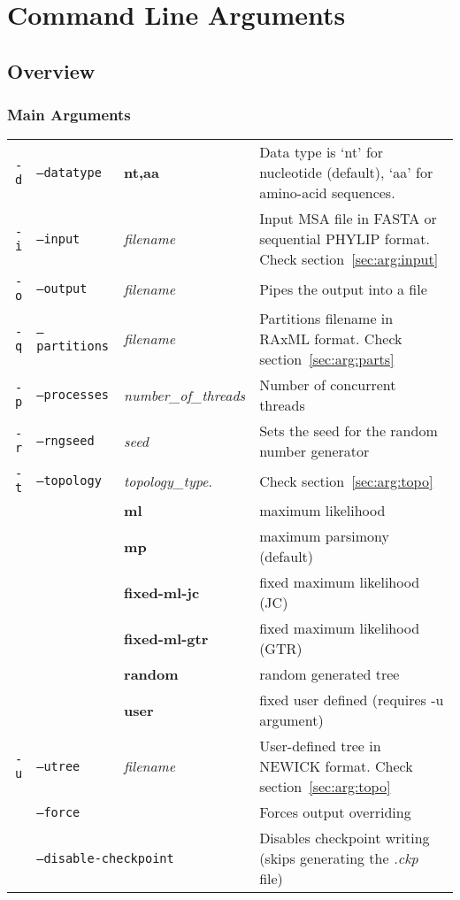\section{Command Line Arguments}
\label{sec:arguments}

\subsection{Overview}

\subsubsection{Main Arguments}

\begin{tabular}{rllp{}}
  \hline
  \texttt{-d} & \texttt{--datatype}   & \bf{nt},\bf{aa} & Data type is `nt' for nucleotide (default), `aa' for amino-acid sequences. \\
  \texttt{-i} & \texttt{--input}      & {\em filename} & Input MSA file in FASTA or sequential PHYLIP format. Check section~\ref{sec:arg:input} \\
  \texttt{-o} & \texttt{--output}     & {\em filename} & Pipes the output into a file \\
  \texttt{-q} & \texttt{--partitions} & {\em filename} & Partitions filename in RAxML format. Check section~\ref{sec:arg:parts} \\
  \texttt{-p} & \texttt{--processes}  & {\em number\_of\_threads} & Number of concurrent threads \\
  \texttt{-r} & \texttt{--rngseed}    & {\em seed} & Sets the seed for the random number generator \\
  \texttt{-t} & \texttt{--topology}   & {\em topology\_type}. & Check section~\ref{sec:arg:topo} \\
               && \bf{ml}             & maximum likelihood \\
               && \bf{mp}             & maximum parsimony (default)\\
               && \bf{fixed-ml-jc}    & fixed maximum likelihood (JC) \\
               && \bf{fixed-ml-gtr}   & fixed maximum likelihood (GTR) \\
               && \bf{random}         & random generated tree \\
               && \bf{user}           & fixed user defined (requires -u argument) \\
  \texttt{-u} & \texttt{--utree}      & {\em filename} & User-defined tree in NEWICK format. Check section~\ref{sec:arg:topo}\\
              & \texttt{--force}      & & Forces output overriding \\
              & \multicolumn{2}{l}{\texttt{--disable-checkpoint}} & Disables checkpoint writing (skips generating the {\em .ckp} file) \\
  \hline
\end{tabular}


